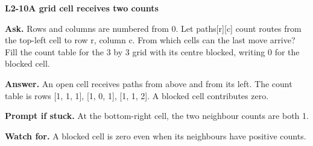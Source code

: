 \documentclass[11pt,a4paper]{article}
\begin{document}
\noindent\begin{minipage}{\textwidth}
{\color{teal}\textbf{L2-10}}\quad \textbf{A grid cell receives two counts}\par\smallskip
\textbf{Ask.} Rows and columns are numbered from 0. Let paths[r][c] count routes from the top-left cell to row r, column c. From which cells can the last move arrive? Fill the count table for the 3 by 3 grid with its centre blocked, writing 0 for the blocked cell.\par\smallskip
\textbf{Answer.} An open cell receives paths from above and from its left. The count table is rows [1, 1, 1], [1, 0, 1], [1, 1, 2]. A blocked cell contributes zero.\par\smallskip
\textbf{Prompt if stuck.} At the bottom-right cell, the two neighbour counts are both 1.\par\smallskip
\textbf{Watch for.} A blocked cell is zero even when its neighbours have positive counts.
\end{minipage}\par{}\medskip
\end{document}
